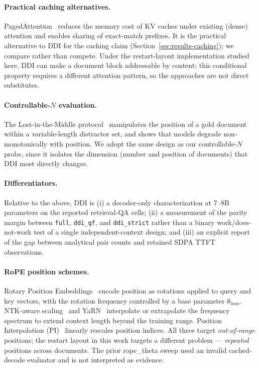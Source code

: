 \paragraph{Practical caching alternatives.}
PagedAttention~\citep{kwon2023pagedattention} reduces the memory cost of KV
caches under existing (dense) attention and enables sharing of exact-match
prefixes. It is the practical alternative to DDI for the caching claim
(Section~\ref{sec:results-caching}); we compare rather than compete.
Under the restart-layout implementation studied here, DDI can make a document
block addressable by content; this conditional property requires a different
attention pattern, so the approaches are not direct substitutes.

\paragraph{Controllable-$N$ evaluation.}
The Lost-in-the-Middle protocol~\citep{liu2023lostmiddle} manipulates the
position of a gold document within a variable-length distractor set, and
shows that models degrade non-monotonically with position. We adopt the same
design as our controllable-$N$ probe, since it isolates the dimension
(number and position of documents) that DDI most directly changes.

\paragraph{Differentiators.}
Relative to the above, DDI is (i) a decoder-only characterization at 7--8B
parameters on the reported retrieval-QA cells; (ii) a
measurement of the parity margin between \texttt{full}, \texttt{ddi\_qf},
and \texttt{ddi\_strict} rather than a binary work/does-not-work test of
a single independent-context design; and (iii) an explicit report of the
gap between analytical pair counts and retained SDPA TTFT observations.

\paragraph{RoPE position schemes.}
Rotary Position Embeddings~\citep{su2021roformer} encode position as
rotations applied to query and key vectors, with the rotation frequency
controlled by a base parameter $\theta_{\text{base}}$.
NTK-aware scaling~\citep{bloc97k2023ntk} and YaRN~\citep{peng2023yarn}
interpolate or extrapolate the frequency spectrum to extend context
length beyond the training range. Position Interpolation
(PI)~\citep{chen2023pi} linearly rescales position indices. All three
target \emph{out-of-range} positions; the restart layout in this work
targets a different problem --- \emph{repeated} positions across documents.
The prior rope\_theta sweep used an invalid cached-decode evaluator and is not
interpreted as evidence.

